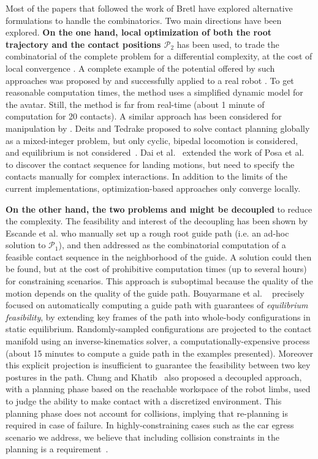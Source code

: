 Most of the papers that followed the work of Bretl have explored alternative formulations to handle the combinatorics. Two main directions have been explored. \textbf{On the one hand, local optimization of both the root trajectory \Pa and the contact positions $\mathcal{P}_2$} has been used, to trade the combinatorial of the complete problem for a differential complexity, at the cost of local convergence \citep{1631739}. A complete example of the potential offered by such approaches was proposed by \cite{Mordatch:2012:DCB:2185520.2185539} and successfully applied to a real robot \citep{mordatch2015}. To get reasonable computation times, the method uses a simplified dynamic model for the avatar. Still, the method is far from real-time  (about 1 minute of computation for 20 contacts).  A similar approach has been considered for manipulation by \cite{gabicciniisrr15}. Deits and Tedrake proposed to solve contact planning globally as a mixed-integer problem, but only cyclic, bipedal locomotion is considered, and equilibrium is not considered~\cite{DBLP:conf/humanoids/DeitsT14}. 
Dai et al.~\cite{dai2014whole} extended the work of Posa et al.~\cite{Posa:2014:DMT:2568343.2568352} to discover the contact sequence for landing motions, but need to specify
the contacts manually for complex interactions.
In addition to the limits of the current implementations, optimization-based approaches only converge locally.

\textbf{On the other hand, the two problems \Pa and \Pb might be decoupled} to reduce the complexity. The feasibility and interest of the decoupling has been shown by Escande et al. \cite{DBLP:conf/iser/EscandeKMG08} who manually set up a rough root guide path (i.e. an ad-hoc solution to $\mathcal{P}_1$), and then addressed \Pb as the combinatorial computation of a feasible contact sequence in the neighborhood of the guide. A solution could then be found, %
but at the cost of prohibitive computation times (up to several hours) for constraining scenarios. This approach is suboptimal because the quality of the motion depends on the quality of the guide path. Bouyarmane et al. ~\cite{Bouyarmane2009} precisely focused on automatically computing a guide path with guarantees of \textit{equilibrium feasibility}, by extending key frames of the path into whole-body configurations in static equilibrium. Randomly-sampled configurations are projected to the contact manifold using an inverse-kinematics solver, a computationally-expensive process (about 15 minutes to compute a guide path in the examples presented). Moreover this explicit projection is insufficient to guarantee the feasibility between two key postures in the path. Chung and Khatib~\cite{7140082} also proposed a decoupled approach, with a planning phase based on the reachable workspace of the robot limbs, used to judge the ability to make contact with a discretized environment. This planning phase does not account for collisions, implying that re-planning is required in case of failure. In highly-constraining cases such as the car egress scenario we address, we believe that including collision constraints in the planning is a requirement~\citep{tonneauisrr15,grey2017footstep}.


